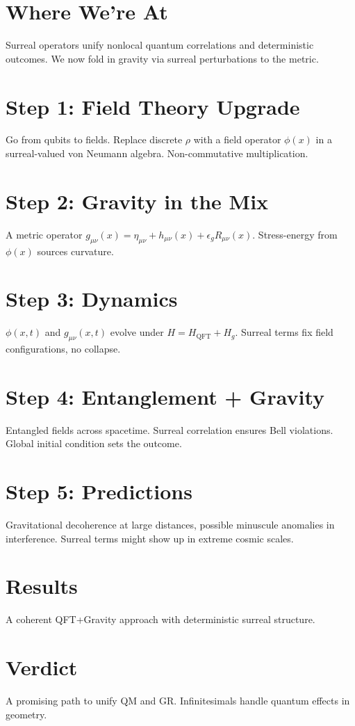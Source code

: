 \documentclass{article}
\begin{document}
\section{Where We're At}
Surreal operators unify nonlocal quantum correlations and deterministic outcomes. We now fold in gravity via surreal perturbations to the metric.

\section{Step 1: Field Theory Upgrade}
Go from qubits to fields. Replace discrete \(\rho\) with a field operator \(\phi(x)\) in a surreal-valued von Neumann algebra. Non-commutative multiplication.

\section{Step 2: Gravity in the Mix}
A metric operator \(g_{\mu\nu}(x) = \eta_{\mu\nu} + h_{\mu\nu}(x) + \epsilon_g R_{\mu\nu}(x)\). Stress-energy from \(\phi(x)\) sources curvature.

\section{Step 3: Dynamics}
\(\phi(x,t)\) and \(g_{\mu\nu}(x,t)\) evolve under \(H = H_{\mathrm{QFT}} + H_g\). Surreal terms fix field configurations, no collapse.

\section{Step 4: Entanglement + Gravity}
Entangled fields across spacetime. Surreal correlation ensures Bell violations. Global initial condition sets the outcome.

\section{Step 5: Predictions}
Gravitational decoherence at large distances, possible minuscule anomalies in interference. Surreal terms might show up in extreme cosmic scales.

\section{Results}
A coherent QFT+Gravity approach with deterministic surreal structure.

\section{Verdict}
A promising path to unify QM and GR. Infinitesimals handle quantum effects in geometry.
\end{document}
